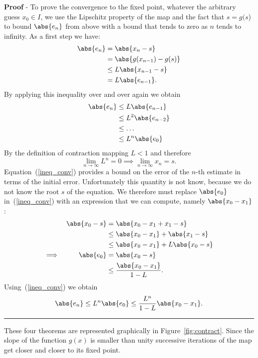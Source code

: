 \noindent
\textbf{Proof} - To prove the convergence to the fixed point, whatever
the arbitrary guess $x_0 \in I$, we use the Lipschitz property of the
map and the fact that $s=g(s$) to bound $\abs{e_n}$ from above
with a bound that tends to zero as $n$ tends to infinity.  As a first step
we have:
%
\begin{align}
  \abs{e_n} & = \abs{ x_n - s} \\
  & = \abs{ g(x_{n-1}) - g(s) } \\
  & \le L \abs{ x_{n-1} - s } \\
  & = L \abs{ e_{n-1} } .
\end{align}
%
By applying this inequality over and over again we obtain
%
\begin{align}
  \abs{ e_n } & \le L \abs{ e_{n-1} } \\
  & \le L^2 \abs{ e_{n-2} } \\
  & \le \ldots \\
  & \le L^n \abs{ e_0 } \label{ineq_conv}
\end{align}
%
By the definition of contraction mapping $L < 1$ and therefore
%
\begin{equation*}
  \lim_{n \to \infty} L^n = 0 \implies \lim_{n \to \infty} x_n = s .
\end{equation*}
%
Equation~(\ref{ineq_conv}) provides a bound on the error of the $n$-th
estimate in terms of the initial error.   Unfortunately this quantity
is not know, because we do not know the root $s$ of the equation.   We
therefore must replace $\abs{e_0}$ in~(\ref{ineq_conv}) with an expression
that we can compute, namely $\abs{x_0 - x_1}$:
%
\begin{align}
  &&  \abs{ x_0 - s } & = \abs{ x_0 - x_1 + x_1 - s } \\
  &&  & \le \abs{ x_0 - x_1 } + \abs{ x_1  - s} \\
  &&  & \le \abs{ x_0 - x_1 } + L \abs{ x_0 - s } \\
  \implies && \abs{e_0} & = \abs{ x_0 - s } \\
  && & \le \frac{\abs{ x_0 - x_1 }}{1-L}.
\end{align}
%
Using~(\ref{ineq_conv}) we obtain
%
\begin{equation}
  \abs{ e_n } \le L^n \abs{ e_0 } \le \frac{L^n}{1-L} \abs{ x_0 - x_1 } .
  \label{err_boundL}
\end{equation}
\hfill \rule{3mm}{3mm}

These four theorems are represented graphically in
Figure~\ref{fig:contract}.  Since the slope of the function $g(x)$ is
smaller than unity successive iterations of the map get closer and
closer to its fixed point.

